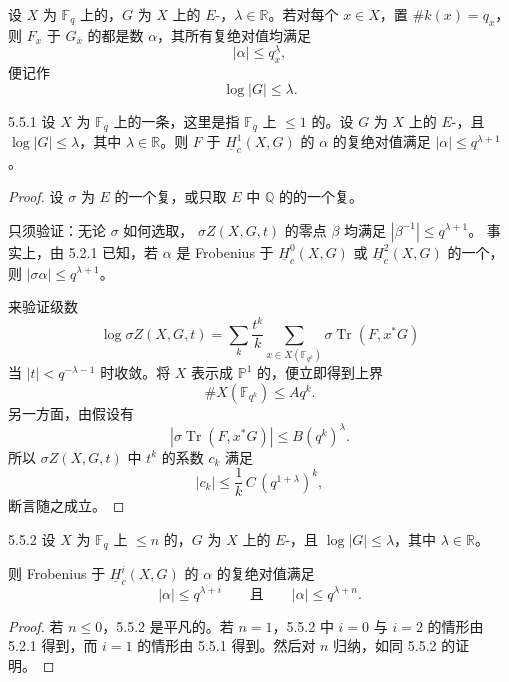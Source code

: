 设 $X$ 为 $\mathbb F_q$ 上的，$G$ 为 $X$ 上的 $E$-，$\lambda\in\mathbb R$。若对每个 $x\in X$，置 $\#k(x)=q_x$，则 $F_x$ 于 $G_{\bar x}$ 的都是数 $\alpha$，其所有复绝对值均满足
\[
|\alpha|\leq q_x^\lambda,
\]
便记作
\[
\log|G|\leq\lambda.
\]

\begin{SGAresult}{}{5.5.1}
设 $X$ 为 $\mathbb F_q$ 上的一条，这里是指 $\mathbb F_q$ 上 $\leq1$ 的。设 $G$ 为 $X$ 上的 $E$-，且 $\log|G|\leq\lambda$，其中 $\lambda\in\mathbb R$。则 $F$ 于 $\underline H_c^1(X,G)$ 的 $\alpha$ 的复绝对值满足 $|\alpha|\leq q^{\lambda+1}$。
\end{SGAresult}
\begin{proof}
设 $\sigma$ 为 $E$ 的一个复，或只取 $E$ 中 $\mathbb Q$ 的的一个复。

只须验证：无论 $\sigma$ 如何选取， $\sigma Z(X,G,t)$ 的零点 $\beta$ 均满足 $|\beta^{-1}|\leq q^{\lambda+1}$。
事实上，由 5.2.1 已知，若 $\alpha$ 是 Frobenius 于 $\underline H_c^0(X,G)$ 或 $\underline H_c^2(X,G)$ 的一个，则 $|\sigma\alpha|\leq q^{\lambda+1}$。

来验证级数
\[
\log\sigma Z(X,G,t)
=\sum_k\frac{t^k}{k}\sum_{x\in X(\mathbb F_{q^k})}\sigma\operatorname{Tr}(F,x^*G)
\]
当 $|t|<q^{-\lambda-1}$ 时收敛。将 $X$ 表示成 $\mathbb P^1$ 的，便立即得到上界
\[
\#X(\mathbb F_{q^k})\leq A q^k.
\]
另一方面，由假设有
\[
|\sigma\operatorname{Tr}(F,x^*G)|\leq B(q^k)^\lambda.
\]
所以 $\sigma Z(X,G,t)$ 中 $t^k$ 的系数 $c_k$ 满足
\[
|c_k|\leq\frac1k\,C\,(q^{1+\lambda})^k,
\]
断言随之成立。
\end{proof}

\begin{SGAresult}{}{5.5.2}
设 $X$ 为 $\mathbb F_q$ 上 $\leq n$ 的，$G$ 为 $X$ 上的 $E$-，且 $\log|G|\leq\lambda$，其中 $\lambda\in\mathbb R$。

则 Frobenius 于 $\underline H_c^i(X,G)$ 的 $\alpha$ 的复绝对值满足
\[
|\alpha|\leq q^{\lambda+i}\qquad\text{且}\qquad |\alpha|\leq q^{\lambda+n}.
\]
\end{SGAresult}
\begin{proof}
若 $n\leq0$，5.5.2 是平凡的。若 $n=1$，5.5.2 中 $i=0$ 与 $i=2$ 的情形由 5.2.1 得到，而 $i=1$ 的情形由 5.5.1 得到。然后对 $n$ 归纳，如同 5.5.2 的证明。
\end{proof}

